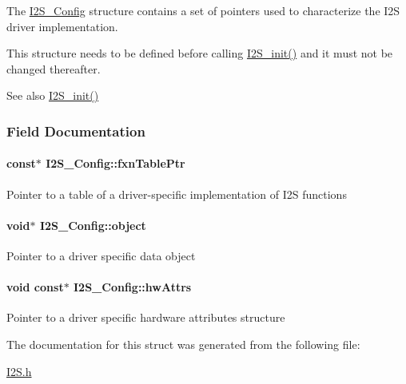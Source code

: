 The \hyperlink{struct_i2_s___config}{I2\+S\+\_\+\+Config} structure contains a set of pointers used to characterize the I2\+S driver implementation.

This structure needs to be defined before calling \hyperlink{_i2_s_8h_a79e8fdf40ee80c49b2cac09a3e428a82}{I2\+S\+\_\+init()} and it must not be changed thereafter.

\begin{DoxySeeAlso}{See also}
\hyperlink{_i2_s_8h_a79e8fdf40ee80c49b2cac09a3e428a82}{I2\+S\+\_\+init()} 
\end{DoxySeeAlso}


\subsubsection{Field Documentation}
\paragraph[{fxn\+Table\+Ptr}]{ const$\ast$ I2\+S\+\_\+\+Config\+::fxn\+Table\+Ptr}\label{struct_i2_s___config_a99407a28338a873ebf0ccbe18b7cfd24}
Pointer to a table of a driver-\/specific implementation of I2\+S functions 
\paragraph[{object}]{\setlength{\rightskip}{0pt plus 5cm}void$\ast$ I2\+S\+\_\+\+Config\+::object}\label{struct_i2_s___config_aa7e7ee65f8c52e2ca5de1cfb7fea1276}
Pointer to a driver specific data object 
\paragraph[{hw\+Attrs}]{\setlength{\rightskip}{0pt plus 5cm}void const$\ast$ I2\+S\+\_\+\+Config\+::hw\+Attrs}\label{struct_i2_s___config_a6ebd7b14353f66a0e0d1c406ff5b481e}
Pointer to a driver specific hardware attributes structure 

The documentation for this struct was generated from the following file\+:\begin{DoxyCompactItemize}
\item 
\hyperlink{_i2_s_8h}{I2\+S.\+h}\end{DoxyCompactItemize}
